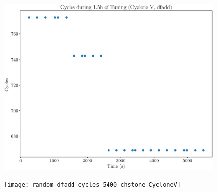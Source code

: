 \documentclass[12pt, a4paper]{article}
\begin{document}
\begin{figure}[htpb]
    \begin{minipage}{.48\textwidth}
        \includegraphics[scale=.25]{dfadd_cycles_5400_chstone_CycloneV}
    \end{minipage}%
    \hfill
    \begin{minipage}{.48\textwidth}
        \texttt{[image: random\_dfadd\_cycles\_5400\_chstone\_CycloneV]}
    \end{minipage}%
\end{figure}
\end{document}
